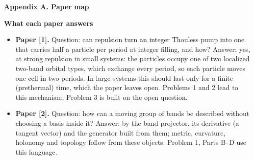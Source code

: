 \documentclass[11pt,a4paper]{article}
\newcommand{\pagetitle}[1]{{\large\bfseries\color{ink}#1}\par\vspace{4pt}}
\newcommand{\smallheading}[1]{\par\Needspace{6\baselineskip}\medskip\textbf{#1}\par}
\begin{document}
\pagetitle{Appendix A. Paper map}
\smallheading{What each paper answers}
\begin{itemize}[leftmargin=6mm,itemsep=2pt]
\item \textbf{Paper [1].} Question: can repulsion turn an integer Thouless pump into one that carries half a particle per period at integer filling, and how? Answer: yes, at strong repulsion in small systems: the particles occupy one of two localized two-band orbital types, which exchange every period, so each particle moves one cell in two periods. In large systems this should last only for a finite (prethermal) time, which the paper leaves open. Problems 1 and 2 lead to this mechanism; Problem 3 is built on the open question.
\item \textbf{Paper [2].} Question: how can a moving group of bands be described without choosing a basis inside it? Answer: by the band projector, its derivative (a tangent vector) and the generator built from them; metric, curvature, holonomy and topology follow from these objects. Problem 1, Parts B--D use this language.
\end{itemize}
\end{document}

